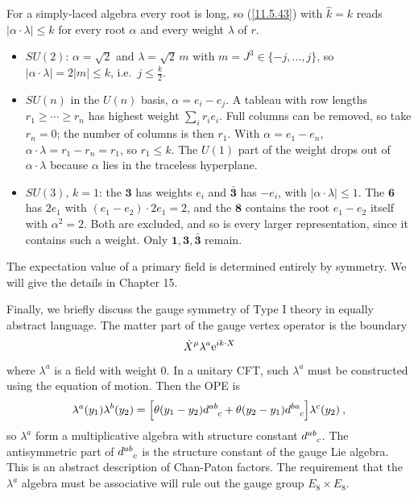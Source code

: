\begin{tcolorbox}[breakable]
	\begin{remark}
		For a simply-laced algebra every root is long, so (\ref{11.5.43}) with $\hat{k}=k$ reads $\lvert\alpha\cdot\lambda\rvert\leq k$ for every root $\alpha$ and every weight $\lambda$ of $r$.
		\begin{itemize}
			\item $SU(2)$: $\alpha=\sqrt{2}$ and $\lambda=\sqrt{2}\,m$ with $m=J^{3}\in\{-j,\dots,j\}$, so $\lvert\alpha\cdot\lambda\rvert=2\lvert m\rvert\leq k$, i.e.\ $j\leq\frac{k}{2}$.
			\item $SU(n)$ in the $U(n)$ basis, $\alpha=e_{i}-e_{j}$. A tableau with row lengths $r_{1}\geq\cdots\geq r_{n}$ has highest weight $\sum_{i}r_{i}e_{i}$. Full columns can be removed, so take $r_{n}=0$; the number of columns is then $r_{1}$. With $\alpha=e_{1}-e_{n}$, $\alpha\cdot\lambda=r_{1}-r_{n}=r_{1}$, so $r_{1}\leq k$. The $U(1)$ part of the weight drops out of $\alpha\cdot\lambda$ because $\alpha$ lies in the traceless hyperplane.
			\item $SU(3)$, $k=1$: the $\mathbf{3}$ has weights $e_{i}$ and $\bar{\mathbf{3}}$ has $-e_{i}$, with $\lvert\alpha\cdot\lambda\rvert\leq1$. The $\mathbf{6}$ has $2e_{1}$ with $(e_{1}-e_{2})\cdot2e_{1}=2$, and the $\mathbf{8}$ contains the root $e_{1}-e_{2}$ itself with $\alpha^{2}=2$. Both are excluded, and so is every larger representation, since it contains such a weight. Only $\mathbf{1},\mathbf{3},\bar{\mathbf{3}}$ remain.
		\end{itemize}
	\end{remark}
\end{tcolorbox}

The expectation value of a primary field is determined entirely by symmetry. We will give the details in Chapter 15.

Finally, we briefly discuss the gauge symmetry of Type I theory in equally abstract language. The matter part of the gauge vertex operator is the boundary
\begin{equation}
	\dot{X}^{\mu}\lambda^{a}\mathrm{e}^{i k\cdot X} \label{11.5.45}
\end{equation}
where $\lambda^{a}$ is a field with weight 0. In a unitary CFT, such $\lambda^{a}$ must be constructed using the equation of motion. Then the OPE is
\begin{equation}
	\lambda^{a}(y_{1})\lambda^{b}(y_{2}) = \Bigl[\theta(y_{1}-y_{2})d\indices{^a^b_c}+
	\theta(y_{2}-y_{1})d\indices{^b^a_c}\Bigr] \lambda^{c}(y_{2}) \:, \label{11.5.46}
\end{equation}
so $\lambda^{a}$ form a multiplicative algebra with structure constant $d\indices{^a^b_c}$. The antisymmetric part of $d\indices{^a^b_c}$ is the structure constant of the gauge Lie algebra. This is an abstract description of Chan-Paton factors. The requirement that the $\lambda^{a}$ algebra must be associative will rule out the gauge group $E_{8}\times E_{8}$.


